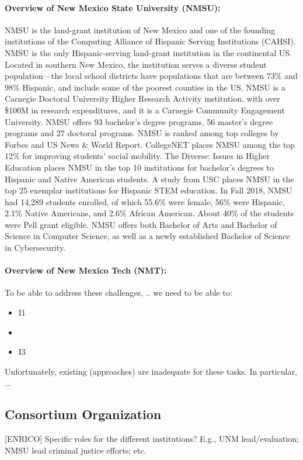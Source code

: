 \paragraph{Overview of New Mexico State University (NMSU):}
NMSU is the land-grant institution of New Mexico and one of the founding institutions of the Computing Alliance of Hispanic Serving Institutions (CAHSI). NMSU is the only Hispanic-serving land-grant institution in the continental US. Located in southern New Mexico, the institution serves a diverse student population---the local school districts have populations that are between 73\% and 98\% Hispanic, and include some of
the poorest counties in the US. NMSU is a Carnegie Doctoral University Higher Research Activity institution, with over \$100M in research expenditures, and it is a Carnegie Community Engagement University. NMSU offers 93 bachelor's degree programs, 56 master's degree programs and 27 doctoral programs. NMSU is ranked among top colleges by Forbes and US News \& World Report. CollegeNET places NMSU among the top 12\% for improving students’ social mobility. The Diverse: Issues in Higher Education places NMSU
in the top 10 institutions for bachelor’s degrees to Hispanic and Native American students. A study from USC places NMSU in the top 25 exemplar institutions for Hispanic STEM education.
In Fall 2018, NMSU had 14,289 students enrolled, of which 55.6\% were female, 56\% were Hispanic, 2.1\%
Native Americans, and 2.6\% African American. About 40\% of the students were Pell grant eligible.
NMSU offers both Bachelor of Arts and Bachelor of Science in Computer Science, as well as a newly established Bachelor of Science in Cybersecurity.  

\paragraph{Overview of New Mexico Tech (NMT):}

To be able to address these challenges, .. we need to be able to:
\begin{itemize}
\item I1
\item 
\item I3
\end{itemize}

Unfortunately, existing (approaches) are inadequate for these tasks. In particular, ...

\subsection{Consortium Organization}

[ENRICO] Specific roles for the different institutions? E.g., UNM lead/evaluation; NMSU lead criminal justice efforts; etc.